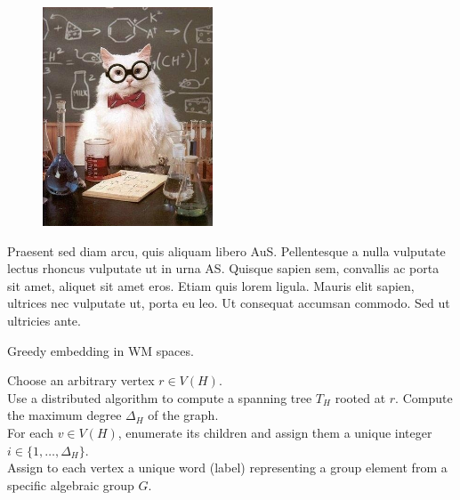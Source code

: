 \begin{figure}[thb]
	\centering
		\includegraphics[width=0.45\textwidth]{figures/example.jpg}
	\label{fig:fig2}
\end{figure}

Praesent sed diam arcu, quis aliquam libero \ac{AuS}. Pellentesque a nulla vulputate lectus rhoncus vulputate ut in urna \ac{AS}. Quisque sapien sem, convallis ac porta sit amet, aliquet sit amet eros. Etiam quis lorem ligula. Mauris elit sapien, ultrices nec vulputate ut, porta eu leo. Ut consequat accumsan commodo. Sed ut ultricies ante.

\begin{algorithm}\label{Alg1}
	\begin{algorithmic}[1] 
	 \caption{Greedy embedding in \ac{WM} spaces.}
	\label{alg:AlgorithmX}
				\STATE Choose an arbitrary vertex $r\in{V(H)}$.\\
                \STATE Use a distributed algorithm to compute a spanning tree $T_{H}$ rooted at $r$.
				\STATE Compute the maximum degree $\Delta_H$ of the graph.\\
				\STATE For each $v\in{V(H)}$, enumerate its children and assign them a unique integer $i\in{\{1, \dots{}, \Delta_H\}}$.\\
				\STATE Assign to each vertex a unique word (label) representing a group element from a specific algebraic group $G$.\\ 
	\end{algorithmic}
\end{algorithm}


